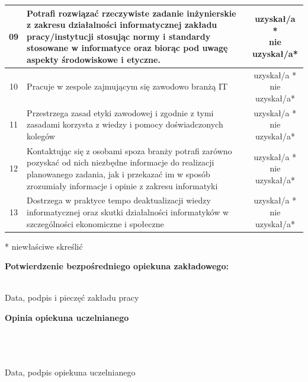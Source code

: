 \documentclass[11pt,a4paper]{article}
\begin{document}
\begin{longtable}{|c|p{11cm}|c|}
09 & Potrafi rozwiązać rzeczywiste zadanie inżynierskie z zakresu działalności informatycznej zakładu pracy/instytucji stosując normy i standardy stosowane w informatyce oraz biorąc pod uwagę aspekty środowiskowe i etyczne. & \makecell{uzyskał/a *\\ nie uzyskał/a*} \\ \hline
10 & Pracuje w zespole zajmującym się zawodowo branżą IT & \makecell{uzyskał/a *\\ nie uzyskał/a*} \\ \hline
11 & Przestrzega zasad etyki zawodowej i zgodnie z tymi zasadami korzysta z wiedzy i pomocy doświadczonych kolegów & \makecell{uzyskał/a *\\ nie uzyskał/a*} \\ \hline
12 & Kontaktując się z osobami spoza branży potrafi zarówno pozyskać od nich niezbędne informacje do realizacji planowanego zadania, jak i przekazać im w sposób zrozumiały informacje i opinie z zakresu informatyki & \makecell{uzyskał/a *\\ nie uzyskał/a*} \\ \hline
13 & Dostrzega w praktyce tempo deaktualizacji wiedzy informatycznej oraz skutki działalności informatyków w szczególności ekonomiczne i społeczne & \makecell{uzyskał/a *\\ nie uzyskał/a*} \\ \hline
\end{longtable}

\vspace{1em}
\noindent \footnotesize{* niewłaściwe skreślić} \normalsize

\vspace{2em}
\noindent \textbf{Potwierdzenie bezpośredniego opiekuna zakładowego:}

\vspace{2em}
\noindent\hfill
\begin{minipage}[t]{0.45\textwidth}
\centering
\dotfill \\
\small Data, podpis i pieczęć zakładu pracy
\end{minipage}

\vspace{1.5em}
\noindent \textbf{Opinia opiekuna uczelnianego} \\[0.5em]
\dotfill \\
\dotfill \\
\dotfill 

\vspace{2em}
\noindent\hfill
\begin{minipage}[t]{0.45\textwidth}
\centering
\dotfill \\
\small Data, podpis opiekuna uczelnianego
\end{minipage}
\end{document}
